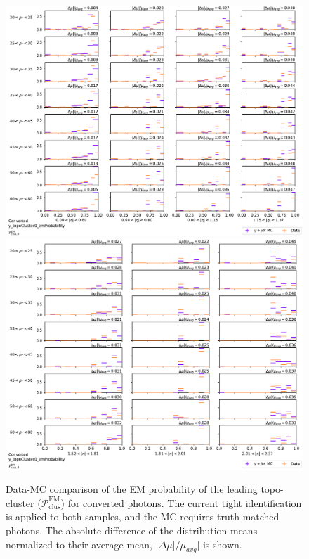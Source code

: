 \begin{figure}[!thp]
    \centering
    \includegraphics[width=.74\textwidth]{appendices/datamc_images/y_topoCluster0_emProbability_Converted_lowerEta.pdf}
    \includegraphics[width=.74\textwidth]{appendices/datamc_images/y_topoCluster0_emProbability_Converted_upperEta.pdf}
    \caption[Data-MC comparison of the \gls{EM} probability of the leading topo-cluster ($\mathcal{P}_{\text{clus}}^{\text{EM}}$) for converted photons]{Data-MC comparison of the \gls{EM} probability of the leading topo-cluster ($\mathcal{P}_{\text{clus}}^{\text{EM}}$) for converted photons. The current tight identification is applied to both samples, and the \gls{MC} requires truth-matched photons. The absolute difference of the distribution means normalized to their average mean, $|\Delta \mu|/\mu_{avg}|$ is shown.}
    \label{fig:dmc-c-emp}
\end{figure}
